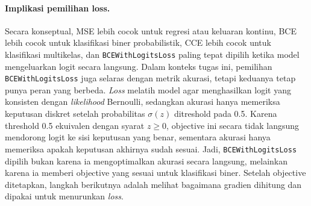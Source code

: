 \documentclass{article}
\begin{document}
\paragraph{Implikasi pemilihan loss.}
Secara konseptual, MSE lebih cocok untuk regresi atau keluaran kontinu, BCE lebih cocok untuk klasifikasi biner probabilistik, CCE lebih cocok untuk klasifikasi multikelas, dan \texttt{BCEWithLogitsLoss} paling tepat dipilih ketika model mengeluarkan logit secara langsung. Dalam konteks tugas ini, pemilihan \texttt{BCEWithLogitsLoss} juga selaras dengan metrik akurasi, tetapi keduanya tetap punya peran yang berbeda. \textit{Loss} melatih model agar menghasilkan logit yang konsisten dengan \textit{likelihood} Bernoulli, sedangkan akurasi hanya memeriksa keputusan diskret setelah probabilitas $\sigma(z)$ ditreshold pada 0.5. Karena threshold 0.5 ekuivalen dengan syarat $z\ge 0$, objective ini secara tidak langsung mendorong logit ke sisi keputusan yang benar, sementara akurasi hanya memeriksa apakah keputusan akhirnya sudah sesuai. Jadi, \texttt{BCEWithLogitsLoss} dipilih bukan karena ia mengoptimalkan akurasi secara langsung, melainkan karena ia memberi objective yang sesuai untuk klasifikasi biner. Setelah objective ditetapkan, langkah berikutnya adalah melihat bagaimana gradien dihitung dan dipakai untuk menurunkan \textit{loss}.
\end{document}
